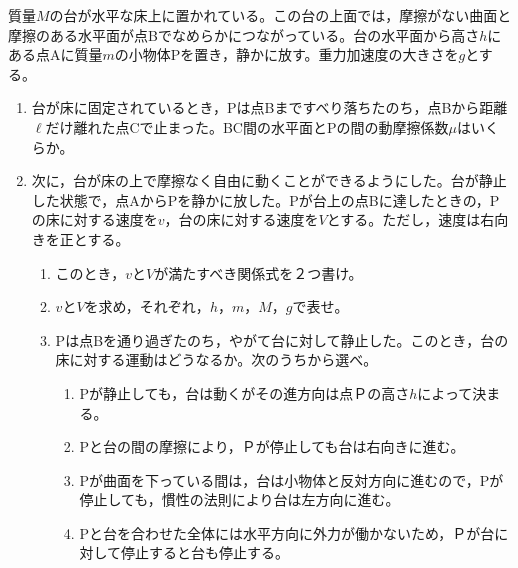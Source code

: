 \hakosyokika
\item
    \begin{mawarikomi}{180pt}{}
        質量$M$の台が水平な床上に置かれている。この台の上面では，摩擦がない曲面と摩擦のある水平面が点Bでなめらかにつながっている。台の水平面から高さ$h$にある点Aに質量$m$の小物体Pを置き，静かに放す。重力加速度の大きさを$g$とする。
        \begin{enumerate}
            \item 台が床に固定されているとき，Pは点Bまですべり落ちたのち，点Bから距離$\ell $だけ離れた点Cで止まった。BC間の水平面とPの間の動摩擦係数$\mu$はいくらか。
            \item 次に，台が床の上で摩擦なく自由に動くことができるようにした。台が静止した状態で，点AからPを静かに放した。Pが台上の点Bに達したときの，Pの床に対する速度を$v$，台の床に対する速度を$V$とする。ただし，速度は右向きを正とする。
                \begin{enumerate}
                    \item このとき，$v$と$V$が満たすべき関係式を２つ書け。
                    \item $v$と$V$を求め，それぞれ，$h$，$m$，$M$，$g$で表せ。
                    \item Pは点Bを通り過ぎたのち，やがて台に対して静止した。このとき，台の床に対する運動はどうなるか。次のうちから選べ。
                    \begin{enumerate}[m]
                        \item Pが静止しても，台は動くがその進方向は点Ｐの高さ$h$によって決まる。
                        \item Pと台の間の摩擦により，Ｐが停止しても台は右向きに進む。
                        \item Pが曲面を下っている間は，台は小物体と反対方向に進むので，Pが停止しても，慣性の法則により台は左方向に進む。
                        \item Pと台を合わせた全体には水平方向に外力が働かないため，Ｐが台に対して停止すると台も停止する。
                    \end{enumerate}
                \end{enumerate}
        \end{enumerate}
    \end{mawarikomi}